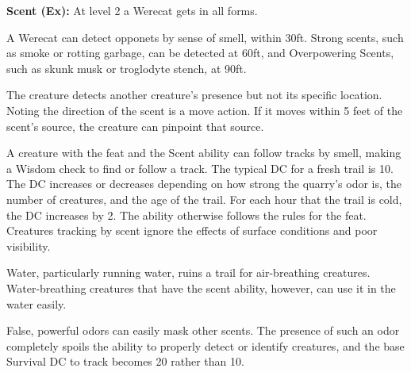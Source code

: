 \textbf{Scent (Ex):}  At level 2 a Werecat gets  in all forms.

A Werecat can detect opponets by sense of smell, within 30ft. Strong scents, such as smoke or rotting garbage, can be detected at 60ft, and Overpowering Scents, such as skunk musk or troglodyte stench, at 90ft.

The creature detects another creature’s presence but not its specific location. Noting the direction of the scent is a move action. If it moves within 5 feet of the scent’s source, the creature can pinpoint that source.

A creature with the  feat and the Scent ability can follow tracks by smell, making a Wisdom check to find or follow a track. The typical DC for a fresh trail is 10. The DC increases or decreases depending on how strong the quarry’s odor is, the number of creatures, and the age of the trail. For each hour that the trail is cold, the DC increases by 2. The ability otherwise follows the rules for the  feat. Creatures tracking by scent ignore the effects of surface conditions and poor visibility.

Water, particularly running water, ruins a trail for air-breathing creatures. Water-breathing creatures that have the scent ability, however, can use it in the water easily.

False, powerful odors can easily mask other scents. The presence of such an odor completely spoils the ability to properly detect or identify creatures, and the base Survival DC to track becomes 20 rather than 10.																							